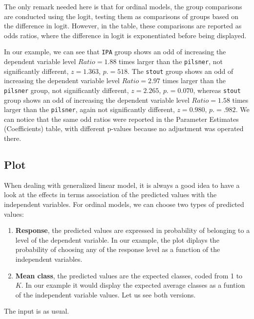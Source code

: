 \documentclass[
]{book}
\providecommand{\tightlist}{%
  \setlength{\itemsep}{0pt}\setlength{\parskip}{0pt}}
\begin{document}
The only remark needed here is that for ordinal models, the group comparisons are conducted using the logit, testing them as comparisons of groups based on the difference in logit. However, in the table, these comparisons are reported as odds ratios, where the difference in logit is exponentiated before being displayed.

In our example, we can see that \texttt{IPA} group shows an odd of increasing the dependent variable level \(Ratio=1.88\) times larger than the \texttt{pilsner}, not significantly different, \(z=1.363\), \(p.=518\). The \texttt{stout} group shows an odd of increasing the dependent variable level \(Ratio=2.97\) times larger than the \texttt{pilsner} group, not significantly different, \(z=2.265\), \(p.=0.070\), whereas \texttt{stout} group shows an odd of increasing the dependent variable level \(Ratio=1.58\) times larger than the \texttt{pilsner}, again not significantly different, \(z=0.980\), \(p.=.982\). We can notice that the same odd ratios were reported in the {Parameter Estimates (Coefficients)} table, with different p-values because no adjustment was operated there.

\hypertarget{plot-1}{%
\subsection{Plot}\label{plot-1}}

When dealing with generalized linear model, it is always a good idea to have a look at the effects in terms association of the predicted values with the independent variables. For ordinal models, we can choose two types of predicted values:

\begin{enumerate}
\def\labelenumi{\arabic{enumi})}
\tightlist
\item
  \textbf{Response}, the predicted values are expressed in probability of belonging to a level of the dependent variable. In our example, the plot diplays the probability of choosing any of the response level as a function of the independent variables.
\item
  \textbf{Mean class}, the predicted values are the expected classes, coded from 1 to \(K\). In our example it would display the expected average classes as a funtion of the independent variable values. Let us see both versions.
\end{enumerate}

The input is as usual.
\end{document}
